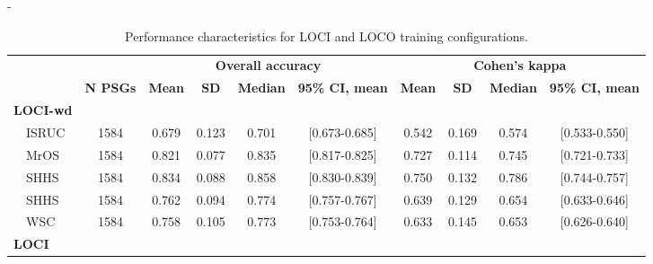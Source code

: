 \begin{table}[tb]
\begin{adjustwidth*}{}{-\marginparsep}
\begin{threeparttable}
\footnotesize
\caption[\acs{MASSC}v2 performance for \acs{LOCI} and \acs{LOCO}.]{Performance characteristics for \acs{LOCI} and \acs{LOCO} training configurations.}
\label{tab:sleep-stages:paper-ii:table-s02}
\begin{tabular}{@{}lccccccccc@{}}
\toprule
                 &                 & \multicolumn{4}{c}{\textbf{Overall accuracy}}                         & \multicolumn{4}{c}{\textbf{Cohen’s kappa}}                            \\ \cline{3-10}
                 & \textbf{N PSGs} & \textbf{Mean} & \textbf{SD} & \textbf{Median} & \textbf{95\% CI, mean} & \textbf{Mean} & \textbf{SD} & \textbf{Median} & \textbf{95\% CI, mean} \\ \midrule
\textbf{LOCI-wd} &                 &               &             &                 &                       &               &             &                 &                       \\
\(\quad\)\acs{ISRUC}            & 1584            & 0.679         & 0.123       & 0.701           & [0.673-0.685]         & 0.542         & 0.169       & 0.574           & [0.533-0.550]         \\
\(\quad\)\acs{MrOS}             & 1584            & 0.821         & 0.077       & 0.835           & [0.817-0.825]         & 0.727         & 0.114       & 0.745           & [0.721-0.733]         \\
\(\quad\)\acs{SHHS}             & 1584            & 0.834         & 0.088       & 0.858           & [0.830-0.839]         & 0.750         & 0.132       & 0.786           & [0.744-0.757]         \\
\(\quad\)\acs{SHHS}              & 1584            & 0.762         & 0.094       & 0.774           & [0.757-0.767]         & 0.639         & 0.129       & 0.654           & [0.633-0.646]         \\
\(\quad\)\acs{WSC}              & 1584            & 0.758         & 0.105       & 0.773           & [0.753-0.764]         & 0.633         & 0.145       & 0.653           & [0.626-0.640]         \\
\textbf{LOCI}    &                 &               &             &                 &                       &               &             &                 &                       \\

\end{tabular}
\end{threeparttable}
\end{adjustwidth*}
\end{table}
